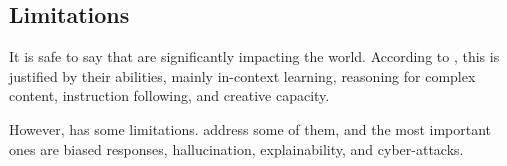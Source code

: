\begin{table}[ht]
    \caption{Comparison of the main {\llm}}
\end{table}



\subsection{Limitations}

It is safe to say that {\llm} are significantly impacting the world. According to \citet{liu_prompting_nodate}, this is justified by their abilities, mainly in-context learning, reasoning for complex content, instruction following, and creative capacity.

However, {\llm} has some limitations. \citet{hadi_LLM_2023} address some of them, and the most important ones are biased responses, hallucination, explainability, and cyber-attacks. 

